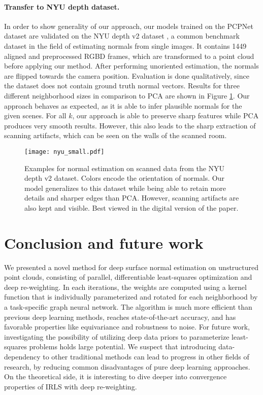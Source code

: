 \documentclass[10pt,twocolumn,letterpaper]{article}
\begin{document}
\paragraph{Transfer to NYU depth dataset.} 
In order to show generality of our approach, our models trained on the PCPNet dataset are validated on the NYU depth v2 dataset \cite{Silberman:2012}, a common benchmark dataset in the field of estimating normals from single images. It contains 1449 aligned and preprocessed RGBD frames, which are transformed to a point cloud before applying our method. After performing unoriented estimation, the normals are flipped towards the camera position.
Evaluation is done qualitatively, since the dataset does not contain ground truth normal vectors. 
Results for three different neighborhood sizes in comparison to PCA are shown in Figure \ref{fig:nyu}. Our approach behaves as expected, as it is able to infer plausible normals for the given scenes. For all $k$, our approach is able to preserve sharp features while PCA produces very smooth results. However, this also leads to the sharp extraction of scanning artifacts, which can be seen on the walls of the scanned room.
 \begin{figure}[t]
\centering
  \texttt{[image: nyu\_small.pdf]}
  \caption{Examples for normal estimation on scanned data from the NYU depth v2 dataset. Colors encode the orientation of normals. Our model generalizes to this dataset while being able to retain more details and sharper edges than PCA. However, scanning artifacts are also kept and visible. Best viewed in the digital version of the paper.
  }
  \label{fig:nyu}
\end{figure}


\section{Conclusion and future work}
We presented a novel method for deep surface normal estimation on unstructured point clouds, consisting of parallel, differentiable least-squares optimization and deep re-weighting. In each iterations, the weights are computed using a kernel function that is individually parameterized and rotated for each neighborhood by a task-specific graph neural network. The algorithm is much more efficient than previous deep learning methods, reaches state-of-the-art accuracy, and has favorable properties like equivariance and robustness to noise. For future work, investigating the possibility of utilizing deep data priors to parameterize least-squares problems holds large potential. We suspect that introducing data-dependency to other traditional methods can lead to progress in other fields of research, by reducing common disadvantages of pure deep learning approaches. On the theoretical side, it is interesting to dive deeper into convergence properties of IRLS with deep re-weighting. 
\end{document}
